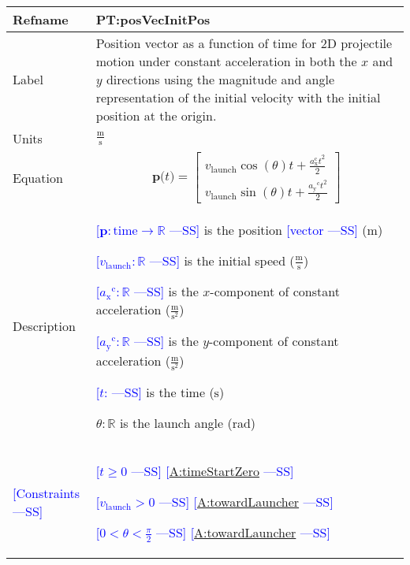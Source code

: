 \documentclass[12pt]{article}
\newcommand{\authornote}[3]{\textcolor{#1}{[#3 ---#2]}}
\newcommand{\authornote}[3]{}
\newcommand{\wss}[1]{\authornote{blue}{SS}{#1}}
\begin{document}
\noindent \begin{minipage}{\textwidth}
\begin{tabular}{>{\raggedright}p{}>{\raggedright\arraybackslash}p{}}
\toprule \textbf{Refname} & \textbf{PT:posVecInitPos} 
\label{PT:posVecInitPos} \\ \midrule Label & Position vector as a function of
time for 2D projectile motion under constant acceleration in both the $x$ and
$y$ directions using the magnitude and angle representation of the initial
velocity with the initial position at the origin.
        
\\ \midrule
Units & $\frac{\text{m}}{\text{s}}$
        
\\ \midrule
Equation & \begin{displaymath}
           \symbf{p}\text{(}t\text{)}=\begin{bmatrix}
                                      {v}_{\text{launch}} \cos(\theta) t +\frac{a_\text{x}^\text{c} t^2}{2}\\
                                      {v}_{\text{launch}} \sin(\theta) t +\frac{{{a_{\text{y}}}^{\text{c}}} t^{2}}{2}
                                      \end{bmatrix}
           \end{displaymath}
\\ \midrule
Description & \begin{symbDescription}
              \item{\wss{$\symbf{p}: \text{time} \rightarrow \mathbb{R}$} is the position \wss{vector} (${\text{m}}$)}
              \item{\wss{${{v}_{\text{launch}}}: \mathbb{R}$} is the initial speed ($\frac{\text{m}}{\text{s}}$)}
              \item{\wss{${{a_{\text{x}}}^{\text{c}}}: \mathbb{R}$} is the $x$-component of constant acceleration ($\frac{\text{m}}{\text{s}^{2}}$)}
              \item{\wss{${{a_{\text{y}}}^{\text{c}}}: \mathbb{R}$} is the $y$-component of constant acceleration ($\frac{\text{m}}{\text{s}^{2}}$)}
              \item{\wss{$t$: \text{time}} is the time (${\text{s}}$)}
              \item $\theta: \mathbb{R}$ is the launch angle (rad)
              \end{symbDescription}

\\ \midrule
\wss{Constraints} & 
\begin{symbDescription}
\item \wss{$t \geq 0$} \wss{\hyperref[timeStartZero]{A:timeStartZero}}
\item \wss{$v_\text{launch} > 0$} \wss{\hyperref[towardLauncher]{A:towardLauncher}}
\item \wss{$
0 < \theta < \frac{\pi}{2}$} \wss{\hyperref[towardLauncher]{A:towardLauncher}}
\end{symbDescription}


\end{tabular}
\end{minipage}
\end{document}
